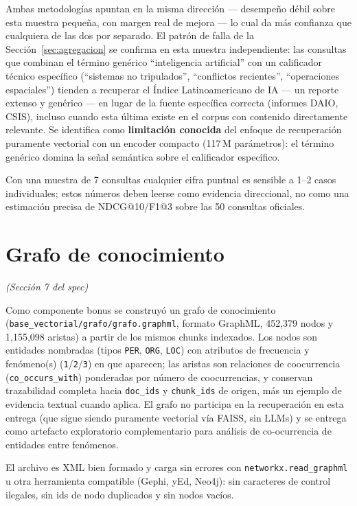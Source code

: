 \documentclass[11pt]{article}
\newcommand{\seccionspec}[1]{\textit{(Sección #1 del spec)}}
\begin{document}
Ambas metodologías apuntan en la misma dirección --- desempeño débil sobre
esta muestra pequeña, con margen real de mejora --- lo cual da más confianza
que cualquiera de las dos por separado. El patrón de falla de la
Sección~\ref{sec:agregacion} se confirma en esta muestra independiente: las
consultas que combinan el término genérico ``inteligencia artificial'' con
un calificador técnico específico (``sistemas no tripulados'', ``conflictos
recientes'', ``operaciones espaciales'') tienden a recuperar el Índice
Latinoamericano de IA --- un reporte extenso y genérico --- en lugar de la
fuente específica correcta (informes DAIO, CSIS), incluso cuando esta última
existe en el corpus con contenido directamente relevante. Se identifica como
\textbf{limitación conocida} del enfoque de recuperación puramente vectorial
con un encoder compacto (117\,M parámetros): el término genérico domina la
señal semántica sobre el calificador específico.

Con una muestra de 7 consultas cualquier cifra puntual es sensible a 1--2
casos individuales; estos números deben leerse como evidencia direccional,
no como una estimación precisa de NDCG@10/F1@3 sobre las 50 consultas
oficiales.

\section{Grafo de conocimiento}
\seccionspec{7}

Como componente bonus se construyó un grafo de conocimiento
(\texttt{base\_vectorial/grafo/grafo.graphml}, formato GraphML, 452{,}379 nodos y
1{,}155{,}098 aristas) a partir de los mismos chunks indexados. Los nodos son
entidades nombradas (tipos \texttt{PER}, \texttt{ORG}, \texttt{LOC}) con
atributos de frecuencia y fenómeno(s) (\texttt{1}/\texttt{2}/\texttt{3}) en
que aparecen; las aristas son relaciones de coocurrencia
(\texttt{co\_occurs\_with}) ponderadas por número de coocurrencias, y
conservan trazabilidad completa hacia \texttt{doc\_ids} y \texttt{chunk\_ids}
de origen, más un ejemplo de evidencia textual cuando aplica. El grafo no
participa en la recuperación en esta entrega (que sigue siendo puramente
vectorial vía FAISS, sin LLMs) y se entrega como artefacto exploratorio
complementario para análisis de co-ocurrencia de entidades entre fenómenos.

El archivo es XML bien formado y carga sin errores con
\texttt{networkx.read\_graphml} u otra herramienta compatible (Gephi, yEd,
Neo4j): sin caracteres de control ilegales, sin ids de nodo duplicados y sin
nodos vacíos.
\end{document}
